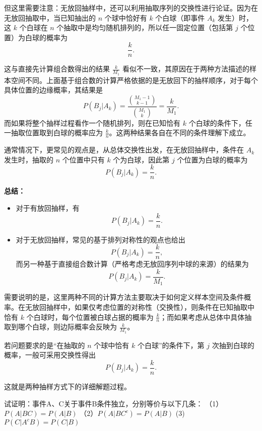 \documentclass[UTF-8,twoside,cs4size]{ctexart}
\begin{document}
但这里需要注意：无放回抽样中，还可以利用抽取序列的交换性进行论证。因为在无放回抽取中，当已知抽出的 $n$ 个球中恰好有 $k$ 个白球（即事件 $A_k$ 发生）时，这 $k$ 个白球在 $n$ 个抽取中是均匀随机排列的，所以任一固定位置（包括第 $j$ 个位置）为白球的概率为
\[
\frac{k}{n}.
\]

这与直接先计算组合数得出的结果 $\frac{k}{M_1}$ 看似不一致，其原因在于两种方法描述的样本空间不同。上面基于组合数的计算严格依据的是无放回下的抽样顺序，对于每个具体位置的边缘概率，其结果是
\[
P(B_j|A_k) = \frac{\binom{M_1-1}{k-1}}{\binom{M_1}{k}} = \frac{k}{M_1}.
\]
而如果将整个抽样过程看作一个随机排列，则在已知恰有 $k$ 个白球的条件下，任一抽取位置取到白球的概率应为 $\frac{k}{n}$。这两种结果各自在不同的条件理解下成立。

通常情况下，更常见的观点是，从总体交换性出发，在无放回抽样中，条件在 $A_k$ 发生时，抽取的 $n$ 个位置中只有 $k$ 个为白球，因此第 $j$ 个位置为白球的概率为
\[
P(B_j|A_k)=\frac{k}{n}.
\]

\bigskip

\textbf{总结：}

\begin{itemize}
    \item 对于有放回抽样，有
    \[
    P(B_j|A_k)=\frac{k}{n}.
    \]
    \item 对于无放回抽样，常见的基于排列对称性的观点也给出
    \[
    P(B_j|A_k)=\frac{k}{n},
    \]
    而另一种基于直接组合数计算（严格考虑无放回序列中球的来源）的结果为
    \[
    P(B_j|A_k)=\frac{k}{M_1}.
    \]
\end{itemize}

需要说明的是，这里两种不同的计算方法主要取决于如何定义样本空间及条件概率。在无放回抽样中，如果仅考虑位置的对称性（交换性），则条件在已知抽取中恰有 $k$ 个白球时，每个位置被白球占据的概率为 $\frac{k}{n}$；而如果考虑从总体中具体抽取到哪个白球，则边际概率会反映为 $\frac{k}{M_1}$。

若问题要求的是“在抽取的 $n$ 个球中恰有 $k$ 个白球”的条件下，第 $j$ 次抽到白球的概率，一般可采用交换性得出
\[
\boxed{P(B_j|A_k)=\frac{k}{n}}.
\]

这就是两种抽样方式下的详细解题过程。

试证明：事件A、C关于事件B条件独立，分别等价与以下几条：
（1）$P(A|BC) = P(A|B)$
（2）$P(A|BC^c) = P(A|B)$
(3) $P(C|A^c B) = P(C|B)$
\end{document}
